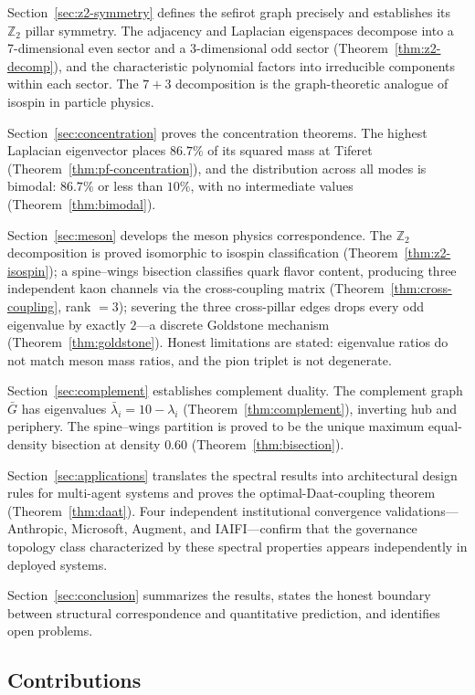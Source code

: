 \documentclass[11pt,a4paper]{amsart}
\theoremstyle{remark}
\newcommand{\bbZ}{\mathbb{Z}}
\begin{document}
Section~\ref{sec:z2-symmetry} defines the sefirot graph precisely and
establishes its $\bbZ_2$ pillar symmetry. The adjacency and Laplacian
eigenspaces decompose into a 7-dimensional even sector and a 3-dimensional
odd sector (Theorem~\ref{thm:z2-decomp}), and the characteristic polynomial
factors into irreducible components within each sector. The $7+3$
decomposition is the graph-theoretic analogue of isospin in particle
physics.

Section~\ref{sec:concentration} proves the concentration theorems. The
highest Laplacian eigenvector places $86.7\%$ of its squared mass at
Tiferet (Theorem~\ref{thm:pf-concentration}), and the distribution across
all modes is bimodal: $86.7\%$ or less than $10\%$, with no intermediate
values (Theorem~\ref{thm:bimodal}).

Section~\ref{sec:meson} develops the meson physics correspondence. The
$\bbZ_2$ decomposition is proved isomorphic to isospin classification
(Theorem~\ref{thm:z2-isospin}); a spine--wings bisection classifies quark
flavor content, producing three independent kaon channels via the
cross-coupling matrix (Theorem~\ref{thm:cross-coupling}, rank $=3$);
severing the three cross-pillar edges drops every odd eigenvalue by exactly
$2$---a discrete Goldstone mechanism (Theorem~\ref{thm:goldstone}). Honest
limitations are stated: eigenvalue ratios do not match meson mass ratios,
and the pion triplet is not degenerate.

Section~\ref{sec:complement} establishes complement duality. The complement
graph $\bar{G}$ has eigenvalues $\bar{\lambda}_i = 10 - \lambda_i$
(Theorem~\ref{thm:complement}), inverting hub and periphery. The spine--wings
partition is proved to be the unique maximum equal-density bisection at
density $0.60$ (Theorem~\ref{thm:bisection}).

Section~\ref{sec:applications} translates the spectral results into
architectural design rules for multi-agent systems and proves the
optimal-Daat-coupling theorem (Theorem~\ref{thm:daat}). Four independent
institutional convergence validations---Anthropic, Microsoft, Augment,
and IAIFI---confirm that the governance topology class characterized by
these spectral properties appears independently in deployed systems.

Section~\ref{sec:conclusion} summarizes the results, states the honest
boundary between structural correspondence and quantitative prediction,
and identifies open problems.

\subsection{Contributions}
\label{sec:contributions}
\end{document}
